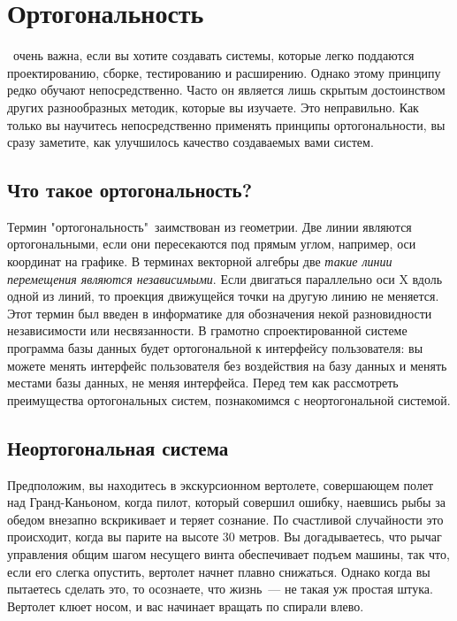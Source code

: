 \section{Ортогональность}

\cite{proghant}

\ очень важна, если вы хотите создавать системы, которые
легко поддаются проектированию, сборке, тестированию и расширению. Однако этому
принципу редко обучают непосредственно. Часто он является лишь скрытым
достоинством других разнообразных методик, которые вы изучаете. Это неправильно.
Как только вы научитесь непосредственно применять принципы ортогональности, вы
сразу заметите, как улучшилось качество создаваемых вами систем.

\subsection{Что такое ортогональность?}

Термин "ортогональность"\ заимствован из геометрии. Две линии являются
ортогональными, если они пересекаются под прямым углом, например, оси координат
на графике. В терминах векторной алгебры две \emph{такие линии перемещения
являются независимыми}. Если двигаться параллельно оси X вдоль одной из линий,
то проекция движущейся точки на другую линию не меняется. Этот термин был введен
в информатике для обозначения некой разновидности независимости или
несвязанности. В грамотно спроектированной системе программа базы данных будет
ортогональной к интерфейсу пользователя: вы можете менять интерфейс пользователя
без воздействия на базу данных и менять местами базы данных, не меняя
интерфейса. Перед тем как рассмотреть преимущества ортогональных систем,
познакомимся с неортогональной системой.

\subsection{Неортогональная система}

Предположим, вы находитесь в экскурсионном вертолете, совершающем полет над
Гранд-Каньоном, когда пилот, который совершил ошибку, наевшись рыбы за обедом
внезапно вскрикивает и теряет сознание. По счастливой случайности это
происходит, когда вы парите на высоте 30 метров. Вы догадываетесь, что рычаг
управления общим шагом несущего винта обеспечивает подъем машины, так что, если
его слегка опустить, вертолет начнет плавно снижаться. Однако когда вы пытаетесь
сделать это, то осознаете, что жизнь\ --- не такая уж простая штука. Вертолет
клюет носом, и вас начинает вращать по спирали влево. 

